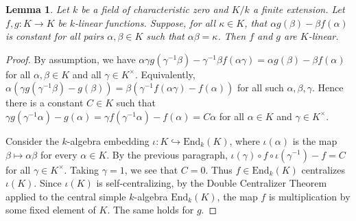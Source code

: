 \documentclass[11pt,a4paper]{amsart}
\theoremstyle{plain}
\newtheorem{lem}[thm]{Lemma}
\theoremstyle{remark}
\begin{document}
\begin{lem} \label{lem:lin.funct}
Let $k$ be a field of characteristic zero and $K/k$ a finite extension.  Let $f, g : K \to K$ be $k$-linear functions.  Suppose, for all $\kappa \in K$, that $\alpha g(\beta) - \beta f(\alpha)$ is constant for all pairs $\alpha, \beta \in K$ such that $\alpha \beta = \kappa$.  Then $f$ and $g$ are $K$-linear.
\end{lem}
\begin{proof}
By assumption, we have
$ \alpha \gamma g(\gamma^{-1} \beta) - \gamma^{-1} \beta f(\alpha \gamma) = \alpha g(\beta) - \beta f(\alpha)$ for all $\alpha, \beta \in K$ and all $\gamma \in K^\times$.  Equivalently,
$\alpha( \gamma g(\gamma^{-1} \beta) - g(\beta)) = \beta ( \gamma^{-1} f(\alpha \gamma) - f(\alpha))$ for all such $\alpha, \beta, \gamma$.  Hence there is a constant $C \in K$ such that $\gamma g(\gamma^{-1} \alpha) - g(\alpha) = \gamma f(\gamma^{-1} \alpha) - f(\alpha) = C \alpha$ for all $\alpha \in K$ and $\gamma \in K^\times$.  


Consider the $k$-algebra embedding $\iota: K \hookrightarrow \mathrm{End}_k(K)$, where $\iota(\alpha)$ is the map $\beta \mapsto \alpha \beta$ for every $\alpha \in K$.  By the previous paragraph, $\iota(\gamma) \circ f \circ \iota(\gamma^{-1}) - f = C$ for all $\gamma \in K^\times$.  Taking $\gamma = 1$, we see that $C = 0$.  Thus $f \in \mathrm{End}_k(K)$ centralizes $\iota(K)$.  Since $\iota(K)$ is self-centralizing, by the Double Centralizer Theorem applied to the central simple $k$-algebra $\mathrm{End}_k(K)$, the map $f$ is multiplication by some fixed element of $K$.  The same holds for $g$.
\end{proof}
\end{document}
